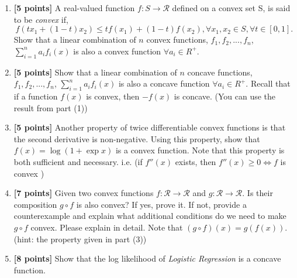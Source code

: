\documentclass{article}
\newenvironment{soln}{
	\leavevmode\color{blue}\ignorespaces
}{}
\begin{document}
\begin{enumerate}
    \item \textbf{[5 points]} A real-valued function $f:S \rightarrow \mathcal{R}$ defined on a convex set S, is said to be \textit{convex} if, $$f(tx_{1}+(1-t)x_{2})\leq tf(x_{1})+(1-t)f(x_{2}), \forall x_{1},x_{2}\in S,\forall t\in [0,1].$$
    Show that a linear combination of $n$ convex functions, $f_1, f_2,...,f_n$, $\sum_{i=1}^n a_if_i(x)$ is also a convex function  $\forall a_i \in R^+$. \\
    
    \begin{soln}

    \end{soln}

    \item \textbf{[5 points]} Show that a linear combination of $n$ concave functions, $f_1, f_2,...,f_n$, $\sum_{i=1}^n a_if_i(x)$ is also a concave function  $\forall a_i \in R^+$. Recall that if a function $f(x)$ is convex, then $-f(x)$ is concave. (You can use the result from part (1)) \\
    \begin{soln}

    \end{soln}
  
    \item \textbf{[5 points]} Another property of twice differentiable convex functions is that the second derivative is non-negative. Using this property, show that $f (x) = \log (1 + \exp x)$ is a convex function. Note that this property is both sufficient and necessary. i.e. (if $f''(x)$ exists, then $f''(x)\ge 0 \iff  f$ is convex ) \\
    \begin{soln}

    \end{soln}

    \item \textbf{[7 points]} Given two convex functions $f:\mathcal{R} \rightarrow \mathcal{R}$ and $g:\mathcal{R} \rightarrow \mathcal{R}$. Is their composition $g \circ f$ is also convex? If yes, prove it. If not, provide a counterexample and explain what additional conditions do we need to make $g \circ f$ convex. Please explain in detail. Note that $(g \circ f) (x) = g(f(x))$. (hint: the property given in part (3))\\
    \begin{soln}

    \end{soln}

    

    \item \textbf{[8 points]} Show that the log likelihood of \textit{Logistic Regression} is a concave function.\\ 
    \begin{soln}

    \end{soln}
   
\end{enumerate}
\end{document}
